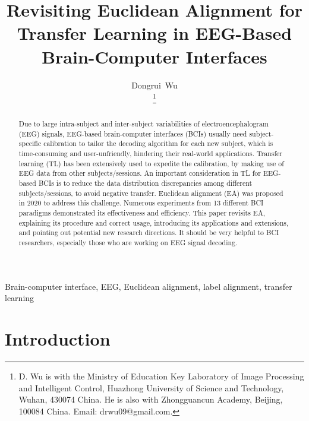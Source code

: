 \documentclass[journal]{IEEEtran}
\begin{document}
\title{Revisiting Euclidean Alignment for Transfer Learning in EEG-Based Brain-Computer Interfaces}

\author{Dongrui~Wu

\thanks{D. Wu is with the Ministry of Education Key Laboratory of Image Processing and Intelligent Control, Huazhong University of Science and Technology, Wuhan, 430074 China. He is also  with Zhongguancun Academy, Beijing, 100084 China. Email: drwu09@gmail.com.}}

\maketitle

\begin{abstract}
Due to large intra-subject and inter-subject variabilities of electroencephalogram (EEG) signals, EEG-based brain-computer interfaces (BCIs) usually need subject-specific calibration to tailor the decoding algorithm for each new subject, which is time-consuming and user-unfriendly, hindering their real-world applications. Transfer learning (TL) has been extensively used to expedite the calibration, by making use of EEG data from other subjects/sessions. An important consideration in TL for EEG-based BCIs is to reduce the data distribution discrepancies among different subjects/sessions, to avoid negative transfer. Euclidean alignment (EA) was proposed in 2020 to address this challenge. Numerous experiments from 13 different BCI paradigms demonstrated its effectiveness and efficiency. This paper revisits EA, explaining its procedure and correct usage, introducing its applications and extensions, and pointing out potential new research directions. It should be very helpful to BCI researchers, especially those who are working on EEG signal decoding.
\end{abstract}

\begin{IEEEkeywords}
Brain-computer interface, EEG, Euclidean alignment, label alignment, transfer learning
\end{IEEEkeywords}

\IEEEpeerreviewmaketitle

\section{Introduction}
\end{document}
